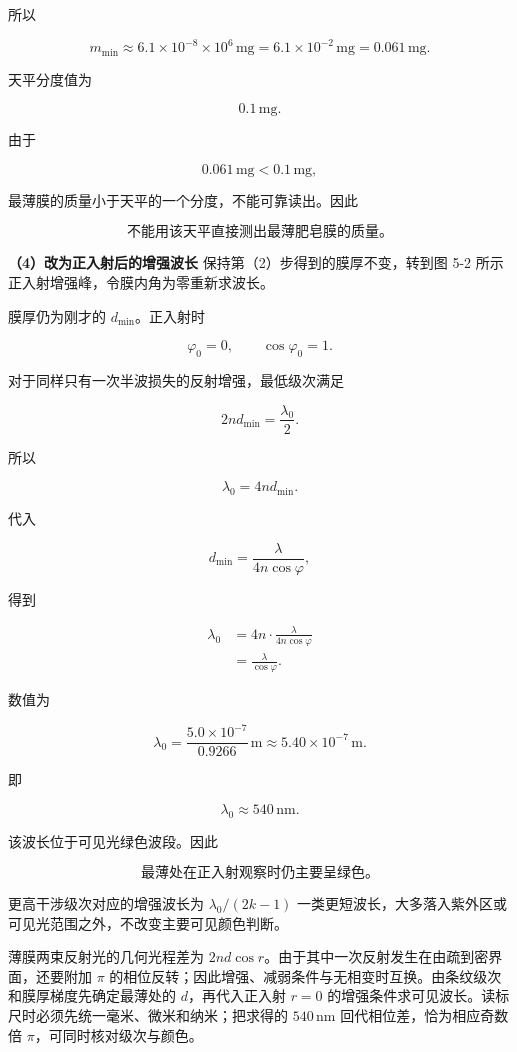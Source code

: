 \documentclass[12pt,a4paper,UTF8]{ctexart}
\begin{document}
所以

\[m_{\min}
\approx6.1\times10^{-8}\times10^6\,\mathrm{mg}
=6.1\times10^{-2}\,\mathrm{mg}
=0.061\,\mathrm{mg}.\]

天平分度值为

\[0.1\,\mathrm{mg}.\]

由于

\[0.061\,\mathrm{mg}<0.1\,\mathrm{mg},\]

最薄膜的质量小于天平的一个分度，不能可靠读出。因此

\[\boxed{\text{不能用该天平直接测出最薄肥皂膜的质量。}}\]

\textbf{（4）改为正入射后的增强波长} 保持第（2）步得到的膜厚不变，转到图
5-2 所示正入射增强峰，令膜内角为零重新求波长。

膜厚仍为刚才的 \(d_{\min}\)。正入射时

\[\varphi_0=0,\qquad \cos\varphi_0=1.\]

对于同样只有一次半波损失的反射增强，最低级次满足

\[2nd_{\min}=\frac{\lambda_0}{2}.\]

所以

\[\lambda_0=4nd_{\min}.\]

代入

\[d_{\min}=\frac{\lambda}{4n\cos\varphi},\]

得到

\[\begin{aligned}
\lambda_0
&=4n\cdot\frac{\lambda}{4n\cos\varphi}\\
&=\frac{\lambda}{\cos\varphi}.
\end{aligned}\]

数值为

\[\lambda_0
=\frac{5.0\times10^{-7}}{0.9266}\,\mathrm m
\approx5.40\times10^{-7}\,\mathrm m.\]

即

\[\lambda_0\approx540\,\mathrm{nm}.\]

该波长位于可见光绿色波段。因此

\[\boxed{\text{最薄处在正入射观察时仍主要呈绿色。}}\]

更高干涉级次对应的增强波长为 \(\lambda_0/(2k-1)\)
一类更短波长，大多落入紫外区或可见光范围之外，不改变主要可见颜色判断。

薄膜两束反射光的几何光程差为
\(2nd\cos r\)。由于其中一次反射发生在由疏到密界面，还要附加 \(\pi\)
的相位反转；因此增强、减弱条件与无相变时互换。由条纹级次和膜厚梯度先确定最薄处的
\(d\)，再代入正入射 \(r=0\)
的增强条件求可见波长。读标尺时必须先统一毫米、微米和纳米；把求得的
\(540\,\mathrm{nm}\) 回代相位差，恰为相应奇数倍
\(\pi\)，可同时核对级次与颜色。
\end{document}
